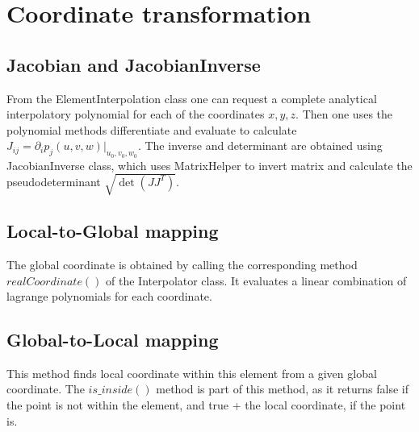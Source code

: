 \section{Coordinate transformation}

\subsection{Jacobian and JacobianInverse}

From the ElementInterpolation class one can request a complete analytical interpolatory polynomial for each of the coordinates $x,y,z$. Then one uses the polynomial methods differentiate and evaluate to calculate $J_{ij} = \partial_i p_j (u,v,w) |_{u_0, v_0, w_0}$. The inverse and determinant are obtained using JacobianInverse class, which uses MatrixHelper to invert matrix and calculate the pseudodeterminant $\sqrt{\det(JJ^T)}$. \\

\subsection{Local-to-Global mapping}

The global coordinate is obtained by calling the corresponding method $realCoordinate()$ of the Interpolator class. It evaluates a linear combination of lagrange polynomials for each coordinate.

\subsection{Global-to-Local mapping}

This method finds local coordinate within this element from a given global coordinate. The $is\_inside()$ method is part of this method, as it returns false if the point is not within the element, and true + the local coordinate, if the point is. \\

